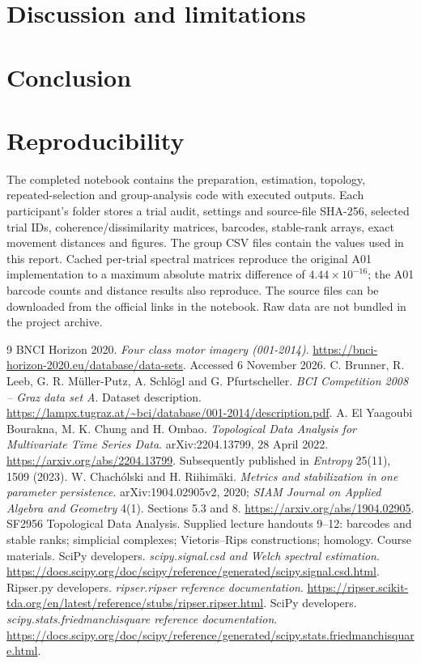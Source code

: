 \documentclass[11pt,a4paper]{article}
\begin{document}
\section{Discussion and limitations}


\section{Conclusion}


\section*{Reproducibility}
The completed notebook contains the preparation, estimation, topology, repeated-selection and group-analysis code with executed outputs. Each participant's folder stores a trial audit, settings and source-file SHA-256, selected trial IDs, coherence/dissimilarity matrices, barcodes, stable-rank arrays, exact movement distances and figures. The group CSV files contain the values used in this report. Cached per-trial spectral matrices reproduce the original A01 implementation to a maximum absolute matrix difference of $4.44\times10^{-16}$; the A01 barcode counts and distance results also reproduce. The source files can be downloaded from the official links in the notebook. Raw data are not bundled in the project archive.



\begin{thebibliography}{9}
 BNCI Horizon 2020. \emph{Four class motor imagery (001-2014)}. \url{https://bnci-horizon-2020.eu/database/data-sets}. Accessed 6 November 2026.
 C. Brunner, R. Leeb, G. R. M\"uller-Putz, A. Schl\"ogl and G. Pfurtscheller. \emph{BCI Competition 2008 -- Graz data set A}. Dataset description. \url{https://lampx.tugraz.at/~bci/database/001-2014/description.pdf}.
 A. El Yaagoubi Bourakna, M. K. Chung and H. Ombao. \emph{Topological Data Analysis for Multivariate Time Series Data}. arXiv:2204.13799, 28 April 2022. \url{https://arxiv.org/abs/2204.13799}. Subsequently published in \emph{Entropy} 25(11), 1509 (2023).
 W. Chach\'olski and H. Riihim\"aki. \emph{Metrics and stabilization in one parameter persistence}. arXiv:1904.02905v2, 2020; \emph{SIAM Journal on Applied Algebra and Geometry} 4(1). Sections 5.3 and 8. \url{https://arxiv.org/abs/1904.02905}.
 SF2956 Topological Data Analysis. Supplied lecture handouts 9--12: barcodes and stable ranks; simplicial complexes; Vietoris--Rips constructions; homology. Course materials.
 SciPy developers. \emph{scipy.signal.csd and Welch spectral estimation}. \url{https://docs.scipy.org/doc/scipy/reference/generated/scipy.signal.csd.html}.
 Ripser.py developers. \emph{ripser.ripser reference documentation}. \url{https://ripser.scikit-tda.org/en/latest/reference/stubs/ripser.ripser.html}.
 SciPy developers. \emph{scipy.stats.friedmanchisquare reference documentation}. \url{https://docs.scipy.org/doc/scipy/reference/generated/scipy.stats.friedmanchisquare.html}.
\end{thebibliography}
\end{document}
